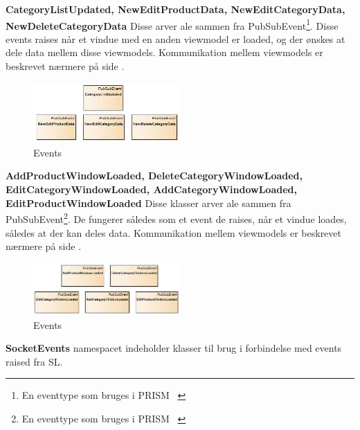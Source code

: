 \textbf{CategoryListUpdated, NewEditProductData, NewEditCategoryData, NewDeleteCategoryData}
Disse arver ale sammen fra PubSubEvent\footnote{En eventtype som bruges i PRISM ~\cite{PRISM}}. Disse events raises når et vindue med en anden viewmodel er loaded, og der ønskes at dele data mellem disse viewmodels. Kommunikation mellem viewmodels er beskrevet nærmere på side \pageref{viewcomm}.  \bigskip
\begin{center}
\begin{figure}[!h]
    \centering
    \includegraphics[width=0.50\textwidth]{Systemdesign/backend/klassebeskrivelser/Images/Events1.png}
    \caption{Events}
    \label{fig:modelhandler}
\end{figure}
\end{center}
\label{Modelhandler_Beskrivelse}
 \bigskip 
\newpage
	



\textbf{AddProductWindowLoaded, DeleteCategoryWindowLoaded, EditCategoryWindowLoaded, AddCategoryWindowLoaded, EditProductWindowLoaded}
Disse klasser arver ale sammen fra PubSubEvent\footnote{En eventtype som bruges i PRISM ~\cite{PRISM}}. De fungerer således som et event de raises, når et vindue loades, således at der kan deles data. Kommunikation mellem viewmodels er beskrevet nærmere på side \pageref{viewcomm}. \bigskip
\begin{center}
\begin{figure}[!h]
    \centering
    \includegraphics[width=0.50\textwidth]{Systemdesign/backend/klassebeskrivelser/Images/Events2.png}
    \caption{Events}
    \label{fig:modelhandler}
\end{figure}
\end{center}
\label{Modelhandler_Beskrivelse}
 \bigskip 


\bigskip
\bigskip

\textbf{SocketEvents} namespacet indeholder klasser til brug i forbindelse med events raised fra \gls{SL}.\\
\bigskip

